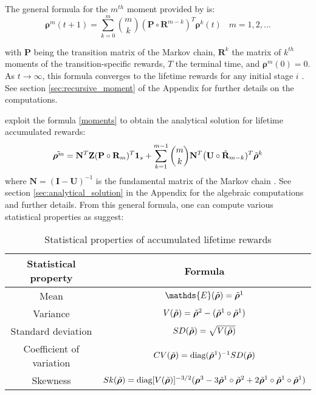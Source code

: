 \documentclass[\main/main.tex]{subfiles}
\begin{document}
The general formula for the  $m^{th}$ moment provided by \cite{Caswell2011} is:
\begin{equation}\label{moments}
    \bm{\rho}^m(t+1) = \sum_{k=0}^{m} {m \choose k} (\mathbf{P} \circ \mathbf{R}^{m-k}) ^ T \bm{\rho}^k(t) \;\; \; m=1,2,...
\end{equation}

with $\mathbf{P}$ being the transition matrix of the Markov
chain, $\mathbf{R}^k$ the matrix of $k^{th}$ moments of the transition-specific rewards, $T$ the terminal time, and $\bm{\rho}^m(0)=0$.
As $t \rightarrow \infty$, this formula converges to the lifetime rewards for any initial stage $i$ \citep{Caswell2011}.\\
See section \ref{sec:recursive_moment} of the Appendix for further details on the computations.




\cite{VanDaalen2017} exploit the formula \ref{moments} to obtain the analytical solution for lifetime accumulated rewards:
\begin{equation}
     \Tilde{\bm{\rho}^m} = \mathbf{N}^T\mathbf{Z} (\mathbf{P} \circ \mathbf{R}_m)^T \bm{1}_s + \sum_{k=1}^{m-1} \binom{m}{k} \mathbf{N}^T \big( \mathbf{U} \circ \Tilde{\mathbf{R}}_{m-k})^T  \Tilde{\bm{\rho}}^k 
\end{equation}
where $\mathbf{N} = (\mathbf{I} - \mathbf{U})^{-1}$ is the fundamental matrix of the Markov chain \citep{Caswell2018}. See section \ref{sec:analytical_solution} in the Appendix for the algebraic computations and further details.
From this general formula, one can compute various statistical properties as \citep{VanDaalen2015} suggest:\\


\begin{table*}[h!]
\centering
{}
\begin{tabular}{cc}
\toprule
    {Statistical property} & {Formula} \\ \midrule
    Mean  & $\mathds{E}(\Tilde{\bm{\rho}}) = \Tilde{\bm{\rho}}^1$     \\
    Variance  & $V(\Tilde{\bm{\rho}}) =  \Tilde{\bm{\rho}}^2 - (\Tilde{\bm{\rho}}^1 \circ \Tilde{\bm{\rho}}^1) $\\
    Standard deviation &  $SD(\Tilde{\bm{\rho}})   =  \sqrt{V(\Tilde{\bm{\rho}})}$  \\
    Coefficient of variation &  $CV (\Tilde{\bm{\rho}}) = \text{diag} (\Tilde{\bm{\rho}}^1)^{-1} SD(\Tilde{\bm{\rho}})$  \\ 
    Skewness  &  $Sk( \Tilde{\bm{\rho}}) = \text{diag} [ V(\Tilde{\bm{\rho}})]^{-3/2} (\bm{\rho}^3 - 3 \Tilde{\bm{\rho}}^1 \circ \Tilde{\bm{\rho}}^2 + 2\Tilde{\bm{\rho}}^1 \circ \Tilde{\bm{\rho}}^1 \circ \Tilde{\bm{\rho}}^1)$\\ 
    \bottomrule
\end{tabular}
\caption{Statistical properties of accumulated lifetime rewards}
\end{table*} 
\end{document}
